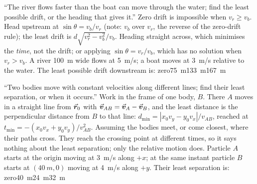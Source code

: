{``The river flows faster than the boat can move through the water; find the least possible drift, or
the heading that gives it.''}
{Zero drift is impossible when $v_r\ge v_b$. Head upstream at $\sin\theta=v_b/v_r$ (note: $v_b$ over
$v_r$, the reverse of the zero-drift rule); the least drift is $d\sqrt{v_r^2-v_b^2}/v_b$.}
{Heading straight across, which minimises the \emph{time}, not the drift; or applying
$\sin\theta=v_r/v_b$, which has no solution when $v_r>v_b$.}
{A river \SI{100}{m} wide flows at \SI{5}{m/s}; a boat moves at \SI{3}{m/s} relative to the water. The
least possible drift downstream is:}
{zero}{\SI{75}{m}}{\SI{133}{m}}{\SI{167}{m}}

{``Two bodies move with constant velocities along different lines; find their least separation, or
when it occurs.''}
{Work in the frame of one body, $B$. There $A$ moves in a straight line from $\vec{\bm{r}}_0$ with
$\vec{\bm{v}}_{AB}=\vec{\bm{v}}_A-\vec{\bm{v}}_B$, and the least distance is the perpendicular distance from $B$ to that line:
$d_{\min}=|x_0v_y-y_0v_x|/v_{AB}$, reached at $t_{\min}=-(x_0v_x+y_0v_y)/v_{AB}^2$.}
{Assuming the bodies meet, or come closest, where their paths cross. They reach the crossing point at
different times, so it says nothing about the least separation; only the relative motion does.}
{Particle $A$ starts at the origin moving at \SI{3}{m/s} along $+x$; at the same instant particle $B$
starts at $(\SI{40}{m},0)$ moving at \SI{4}{m/s} along $+y$. Their least separation is:}
{zero}{\SI{40}{m}}{\SI{24}{m}}{\SI{32}{m}}
